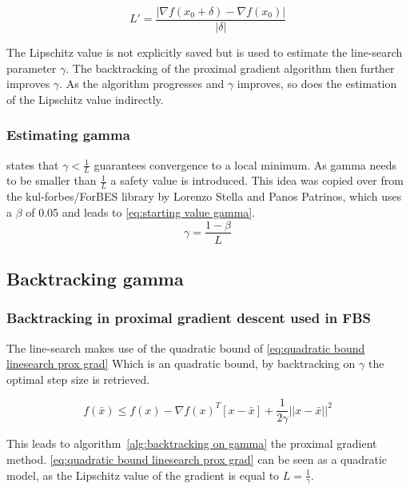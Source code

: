 			\begin{equation}
			L' = \frac{|\nabla f(x_0+\delta)-\nabla f(x_0)|}{|\delta|}
			\label{eq:estimated lipschitz value in starting position}
			\end{equation}
			
			The Lipschitz value is not explicitly saved but is used to estimate the line-search parameter $\gamma$. The backtracking of the proximal gradient algorithm then further improves $\gamma$. As the algorithm progresses and $\gamma$ improves, so does the estimation of the Lipschitz value indirectly.
		
		\subsubsection{Estimating gamma}	
			\cite{LorenzoStella2017} states that $\gamma<\frac{1}{L}$ guarantees convergence to a local minimum. As gamma needs to be smaller than $\frac{1}{L}$ a safety value is introduced. This idea was copied over from the kul-forbes/ForBES library by Lorenzo Stella and Panos Patrinos, which uses a $\beta$ of 0.05 and leads to \eqref{eq:starting value gamma}.
			\begin{equation}
			\gamma = \frac{1-\beta}{L}
			\label{eq:starting value gamma}
			\end{equation}		
	
	\subsection{Backtracking gamma}			
		\subsubsection{Backtracking in proximal gradient descent used in FBS}
			The line-search makes use of the quadratic bound of \eqref{eq:quadratic bound linesearch prox grad} Which is an quadratic bound, by backtracking on $\gamma$ the optimal step size is retrieved.
			
			\begin{equation}
			f({\bar{x}}) \leq f(x) - \nabla f(x)^T[x-\bar{x}] + \frac{1}{2 \gamma}||x-\bar{x}||^2
			\label{eq:quadratic bound linesearch prox grad}
			\end{equation}
			
			This leads to algorithm~\ref{alg:backtracking on gamma} the proximal gradient method. \eqref{eq:quadratic bound linesearch prox grad} can be seen as a quadratic model, as the Lipschitz value of the gradient is equal to $L=\frac{1}{\gamma}$.
			
